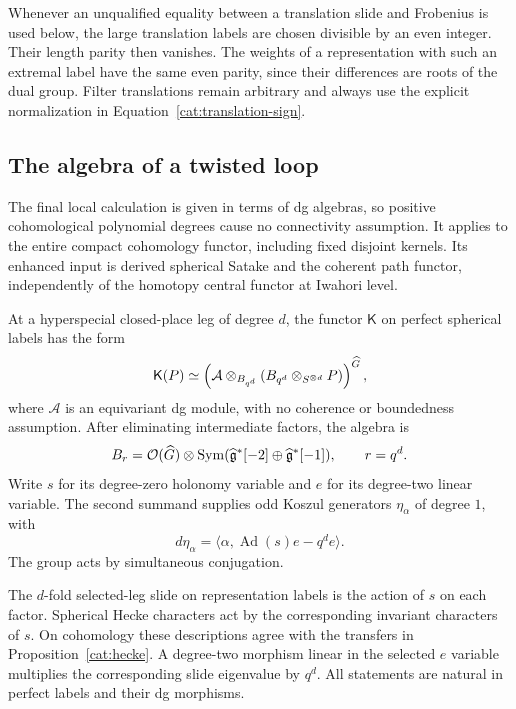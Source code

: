Whenever an unqualified equality between a translation slide
and Frobenius is used below, the large translation labels are
chosen divisible by an even integer. Their length parity then
vanishes. The weights of a representation with such an
extremal label have the same even parity, since their
differences are roots of the dual group. Filter translations
remain arbitrary and always use the explicit normalization
in Equation~\eqref{cat:translation-sign}.

\subsection{The algebra of a twisted loop}

The final local calculation is given in terms of dg algebras,
so positive cohomological polynomial degrees cause no
connectivity assumption. It applies to the entire compact
cohomology functor, including fixed disjoint kernels.
Its enhanced input is derived spherical Satake and the coherent
path functor, independently of the homotopy central functor at
Iwahori level.

\begin{proposition}\label{cat:loops}
At a hyperspecial closed-place leg of degree $d$, the functor
$\mathsf K$ on perfect spherical labels has the form
\begin{equation}\label{cat:loop-pairing}
 \mathsf K(P)\simeq
 \left(\mathcal A\otimes_{B_{q^d}}
                  (B_{q^d}\otimes_{S^{\otimes d}}P)\right)^{\widehat G},
\end{equation}
where $\mathcal A$ is an equivariant dg module, with no
coherence or boundedness assumption. After eliminating
intermediate factors, the algebra is
\begin{equation}\label{cat:loop-algebra}
 B_r=\mathcal O(\widehat G)\otimes
       \operatorname{Sym}(\widehat{\mathfrak g}^*[-2]\oplus\widehat{\mathfrak g}^*[-1]),
 \qquad r=q^d.
\end{equation}
Write $s$ for its degree-zero holonomy variable and $e$ for
its degree-two linear variable. The second summand supplies
odd Koszul generators $\eta_\alpha$ of degree $1$, with
\begin{equation}\label{cat:holonomy}
 d\eta_\alpha=
       \langle\alpha,\operatorname{Ad}(s)e-q^d e\rangle.
\end{equation}
The group acts by simultaneous conjugation.

The $d$-fold selected-leg slide on representation labels is
the action of $s$ on each factor. Spherical Hecke characters
act by the corresponding invariant characters of $s$.
On cohomology these descriptions agree with the transfers in
Proposition~\ref{cat:hecke}. A degree-two morphism linear
in the selected $e$ variable multiplies the corresponding
slide eigenvalue by $q^d$. All statements are natural in
perfect labels and their dg morphisms.
\end{proposition}

